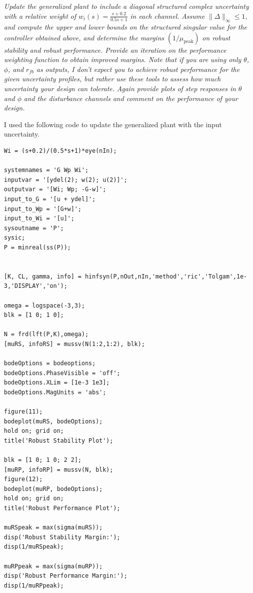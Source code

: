 \documentclass{article}
\begin{document}
\section{}
\textit{Update the generalized plant to include a diagonal structured complex uncertainty with a relative weight of $w_i(s) = \frac{s + 0.2}{0.5 s + 1}$ in each channel. Assume $\|\Delta\|_{\infty} \leq 1$, and compute the upper and lower bounds on the structured singular value for the controller obtained above, and determine the margins $\left(1 / \mu_{\text{peak}}\right)$ on robust stability and robust performance. Provide an iteration on the performance weighting function to obtain improved margins. Note that if you are using only $\theta$, $\phi$, and $r_{fb}$ as outputs, I don't expect you to achieve robust performance for the given uncertainty profiles, but rather use these tools to assess how much uncertainty your design can tolerate. Again provide plots of step responses in $\theta$ and $\phi$ and the disturbance channels and comment on the performance of your design.}

I used the following code to update the generalized plant with the input uncertainty.

\begin{lstlisting}[style=matlabstyle]
Wi = (s+0.2)/(0.5*s+1)*eye(nIn);

systemnames = 'G Wp Wi';
inputvar = '[ydel(2); w(2); u(2)]';
outputvar = '[Wi; Wp; -G-w]';
input_to_G = '[u + ydel]';
input_to_Wp = '[G+w]';
input_to_Wi = '[u]';
sysoutname = 'P';
sysic;
P = minreal(ss(P));


[K, CL, gamma, info] = hinfsyn(P,nOut,nIn,'method','ric','Tolgam',1e-3,'DISPLAY','on');

omega = logspace(-3,3);
blk = [1 0; 1 0];

N = frd(lft(P,K),omega);
[muRS, infoRS] = mussv(N(1:2,1:2), blk);

bodeOptions = bodeoptions;
bodeOptions.PhaseVisible = 'off';
bodeOptions.XLim = [1e-3 1e3];
bodeOptions.MagUnits = 'abs';

figure(11);
bodeplot(muRS, bodeOptions);
hold on; grid on;
title('Robust Stability Plot');

blk = [1 0; 1 0; 2 2];
[muRP, infoRP] = mussv(N, blk);
figure(12);
bodeplot(muRP, bodeOptions);
hold on; grid on;
title('Robust Performance Plot');

muRSpeak = max(sigma(muRS));
disp('Robust Stability Margin:');
disp(1/muRSpeak);

muRPpeak = max(sigma(muRP));
disp('Robust Performance Margin:');
disp(1/muRPpeak);
\end{lstlisting}
\end{document}
